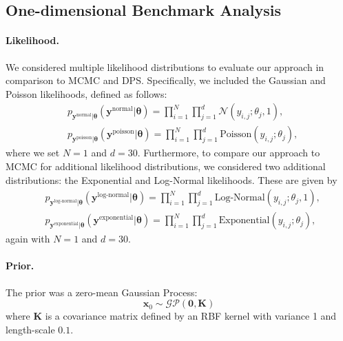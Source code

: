 \subsection{One-dimensional Benchmark Analysis}

\paragraph{Likelihood.} We considered multiple likelihood distributions to evaluate our approach in comparison to MCMC and DPS. Specifically, we included the Gaussian and Poisson likelihoods, defined as follows:
\begin{align*} 
&p_{\mathbf{y}^{\text{normal}} \vert \boldsymbol{\theta}}(\mathbf{y}^{\text{normal}}|\boldsymbol{\theta}) = \prod_{i=1}^{N}\prod_{j=1}^{d} \mathcal{N}\left(y_{i,j};\theta_{j}, 1\right),\\ &p_{\mathbf{y}^{\text{poisson}} \vert \boldsymbol{\theta}}(\mathbf{y}^{\text{poisson}}|\boldsymbol{\theta}) = \prod_{i=1}^{N}\prod_{j=1}^{d} \text{Poisson}\left(y_{i,j};\theta_{j}\right), \end{align*}
where we set $N = 1$ and $d = 30$.
Furthermore, to compare our approach to MCMC for additional likelihood distributions, we considered two additional distributions: the Exponential and Log-Normal likelihoods. These are given by
\begin{align*} 
&p_{\mathbf{y}^{\text{log-normal}} \vert \boldsymbol{\theta}}(\mathbf{y}^{\text{log-normal}}|\boldsymbol{\theta}) = \prod_{i=1}^{N}\prod_{j=1}^{d} \text{Log-Normal}\left(y_{i,j};\theta_{j}, 1\right),\\
&p_{\mathbf{y}^{\text{exponential}} \vert \boldsymbol{\theta}}(\mathbf{y}^{\text{exponential}}|\boldsymbol{\theta}) = \prod_{i=1}^{N}\prod_{j=1}^{d} \text{Exponential}\left(y_{i,j};\theta_{j}\right), 
\end{align*}
again with $N = 1$ and $d = 30$.


\paragraph{Prior.} The prior was a zero-mean Gaussian Process:
\begin{equation*}
    \mathbf{x}_0 \sim \mathcal{GP}(\boldsymbol{0}, \mathbf{K})
\end{equation*}
where $\mathbf{K}$ is a covariance matrix defined by an RBF kernel with variance 1 and length-scale $0.1$. 

